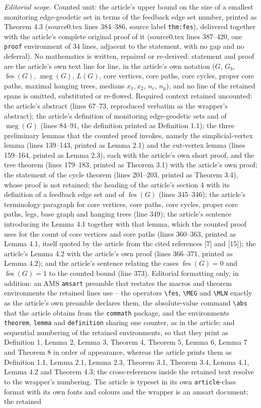 \documentclass[10pt,a4paper]{amsart}
\theoremstyle{plain}
\theoremstyle{definition}
\DeclareMathOperator{\fes}{fes}
\DeclareMathOperator{\MEG}{meg}
\begin{document}
\noindent\textit{Editorial scope.} Counted unit: the article's upper bound on the size of a smallest monitoring edge-geodetic set in terms of the feedback edge set number, printed as Theorem 4.3 (source0.tex lines 384--386, source label \texttt{thm:fes}), delivered together with the article's complete original proof of it (source0.tex lines 387--420, one \texttt{proof} environment of 34 lines, adjacent to the statement, with no gap and no deferral). No mathematics is written, repaired or re-derived: statement and proof are the article's own text line for line, in the article's own notation ($G$, $G_b$, $\fes(G)$, $\MEG(G)$, $L(G)$, core vertices, core paths, core cycles, proper core paths, maximal hanging trees, medians $x_1,x_2$, $n_c$, $n_p$), and no line of the retained spans is omitted, substituted or re-flowed. Required context retained uncounted: the article's abstract (lines 67--73, reproduced verbatim as the wrapper's abstract); the article's definition of monitoring edge-geodetic sets and of $\MEG(G)$ (lines 84--91, the definition printed as Definition 1.1); the three preliminary lemmas that the counted proof invokes, namely the simplicial-vertex lemma (lines 139--143, printed as Lemma 2.1) and the cut-vertex lemma (lines 159--164, printed as Lemma 2.3), each with the article's own short proof, and the tree theorem (lines 179--183, printed as Theorem 3.1) with the article's own proof; the statement of the cycle theorem (lines 201--203, printed as Theorem 3.4), whose proof is not retained; the heading of the article's section 4 with its definition of a feedback edge set and of $\fes(G)$ (lines 345--346); the article's terminology paragraph for core vertices, core paths, core cycles, proper core paths, legs, base graph and hanging trees (line 349); the article's sentence introducing its Lemma 4.1 together with that lemma, which the counted proof uses for the count of core vertices and core paths (lines 360--363, printed as Lemma 4.1, itself quoted by the article from the cited references [7] and [15]); the article's Lemma 4.2 with the article's own proof (lines 366--371, printed as Lemma 4.2); and the article's sentence relating the cases $\fes(G)=0$ and $\fes(G)=1$ to the counted bound (line 373). Editorial formatting only, in addition: an AMS \texttt{amsart} preamble that restates the macros and theorem environments the retained lines use -- the operators \texttt{\textbackslash fes}, \texttt{\textbackslash MEG} and \texttt{\textbackslash MLN} exactly as the article's own preamble declares them, the absolute-value command \texttt{\textbackslash abs} that the article obtains from the \texttt{commath} package, and the environments \texttt{theorem}, \texttt{lemma} and \texttt{definition} sharing one counter, as in the article; and sequential numbering of the retained environments, so that they print as Definition 1, Lemma 2, Lemma 3, Theorem 4, Theorem 5, Lemma 6, Lemma 7 and Theorem 8 in order of appearance, whereas the article prints them as Definition 1.1, Lemma 2.1, Lemma 2.3, Theorem 3.1, Theorem 3.4, Lemma 4.1, Lemma 4.2 and Theorem 4.3; the cross-references inside the retained text resolve to the wrapper's numbering. The article is typeset in its own \texttt{article}-class format with its own fonts and colours and the wrapper is an amsart document; the retained 
\end{document}
